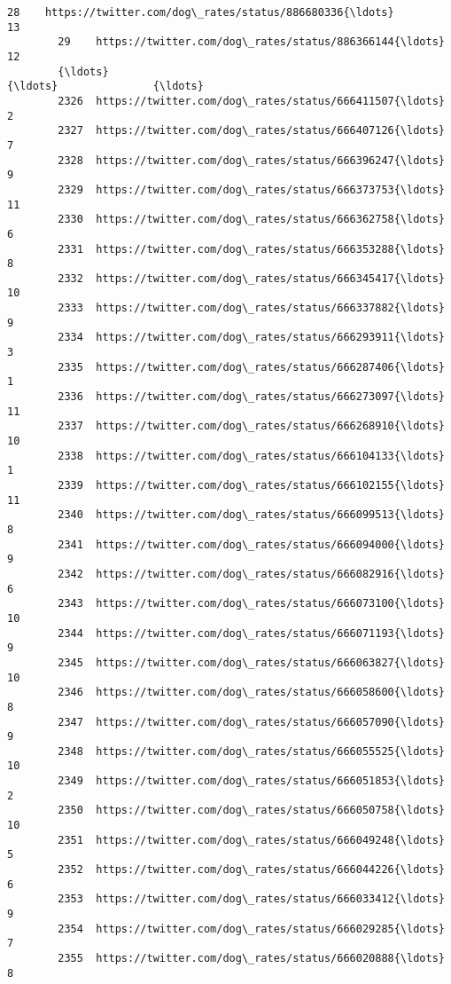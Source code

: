 \documentclass[11pt]{article}
\begin{document}
\begin{Verbatim}[commandchars=\\\{\}]
        28    https://twitter.com/dog\_rates/status/886680336{\ldots}                13   
        29    https://twitter.com/dog\_rates/status/886366144{\ldots}                12   
        {\ldots}                                                 {\ldots}               {\ldots}   
        2326  https://twitter.com/dog\_rates/status/666411507{\ldots}                 2   
        2327  https://twitter.com/dog\_rates/status/666407126{\ldots}                 7   
        2328  https://twitter.com/dog\_rates/status/666396247{\ldots}                 9   
        2329  https://twitter.com/dog\_rates/status/666373753{\ldots}                11   
        2330  https://twitter.com/dog\_rates/status/666362758{\ldots}                 6   
        2331  https://twitter.com/dog\_rates/status/666353288{\ldots}                 8   
        2332  https://twitter.com/dog\_rates/status/666345417{\ldots}                10   
        2333  https://twitter.com/dog\_rates/status/666337882{\ldots}                 9   
        2334  https://twitter.com/dog\_rates/status/666293911{\ldots}                 3   
        2335  https://twitter.com/dog\_rates/status/666287406{\ldots}                 1   
        2336  https://twitter.com/dog\_rates/status/666273097{\ldots}                11   
        2337  https://twitter.com/dog\_rates/status/666268910{\ldots}                10   
        2338  https://twitter.com/dog\_rates/status/666104133{\ldots}                 1   
        2339  https://twitter.com/dog\_rates/status/666102155{\ldots}                11   
        2340  https://twitter.com/dog\_rates/status/666099513{\ldots}                 8   
        2341  https://twitter.com/dog\_rates/status/666094000{\ldots}                 9   
        2342  https://twitter.com/dog\_rates/status/666082916{\ldots}                 6   
        2343  https://twitter.com/dog\_rates/status/666073100{\ldots}                10   
        2344  https://twitter.com/dog\_rates/status/666071193{\ldots}                 9   
        2345  https://twitter.com/dog\_rates/status/666063827{\ldots}                10   
        2346  https://twitter.com/dog\_rates/status/666058600{\ldots}                 8   
        2347  https://twitter.com/dog\_rates/status/666057090{\ldots}                 9   
        2348  https://twitter.com/dog\_rates/status/666055525{\ldots}                10   
        2349  https://twitter.com/dog\_rates/status/666051853{\ldots}                 2   
        2350  https://twitter.com/dog\_rates/status/666050758{\ldots}                10   
        2351  https://twitter.com/dog\_rates/status/666049248{\ldots}                 5   
        2352  https://twitter.com/dog\_rates/status/666044226{\ldots}                 6   
        2353  https://twitter.com/dog\_rates/status/666033412{\ldots}                 9   
        2354  https://twitter.com/dog\_rates/status/666029285{\ldots}                 7   
        2355  https://twitter.com/dog\_rates/status/666020888{\ldots}                 8   
        

\end{Verbatim}
\end{document}
